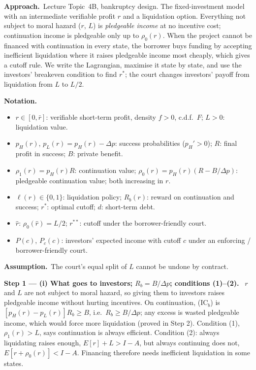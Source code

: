 \documentclass[11pt,a4paper]{article}
\newcommand{\notation}{\par\noindent\textbf{Notation.}}
\newcommand{\step}[2]{\par\medskip\noindent\textbf{Step #1 --- #2.}~}
\newcommand{\assume}{\par\smallskip\noindent\textbf{Assumption.}~}
\newcommand{\approach}{\par\smallskip\noindent\textbf{Approach.}~}
\begin{document}
\approach Lecture Topic~4B, bankruptcy design. The fixed-investment model with an intermediate
verifiable profit $r$ and a liquidation option. Everything not subject to moral hazard ($r$, $L$) is
\emph{pledgeable income} at no incentive cost; continuation income is pledgeable only up to
$\rho_0(r)$. When the project cannot be financed with continuation in every state, the borrower buys
funding by accepting inefficient liquidation where it raises pledgeable income most cheaply, which
gives a cutoff rule. We write the Lagrangian, maximise it state by state, and use the investors'
breakeven condition to find $r^*$; the court changes investors' payoff from liquidation from $L$ to
$L/2$.

\notation
\begin{itemize}
  \item $r\in[0,\bar r]$: verifiable short-term profit, density $f>0$, c.d.f.\ $F$; $L>0$: liquidation value.
  \item $p_H(r)$, $p_L(r)=p_H(r)-\Delta p$: success probabilities ($p_H'>0$); $R$: final profit in success;
        $B$: private benefit.
  \item $\rho_1(r)=p_H(r)R$: continuation value; $\rho_0(r)=p_H(r)(R-B/\Delta p)$: pledgeable
        continuation value; both increasing in $r$.
  \item $\ell(r)\in\{0,1\}$: liquidation policy; $R_b(r)$: reward on continuation and success;
        $r^*$: optimal cutoff; $d$: short-term debt.
  \item $\hat r$: $\rho_0(\hat r)=L/2$; $r^{**}$: cutoff under the borrower-friendly court.
  \item $P(c)$, $P_c(c)$: investors' expected income with cutoff $c$ under an enforcing / borrower-friendly court.
\end{itemize}
\assume The court's equal split of $L$ cannot be undone by contract.

\step{1}{(i) What goes to investors; $R_b=B/\Delta p$; conditions (1)--(2)} $r$ and $L$ are not subject to
moral hazard, so giving them to investors raises pledgeable income without hurting incentives. On
continuation, (IC$_b$) is $[p_H(r)-p_L(r)]R_b\ge B$, i.e.\ $R_b\ge B/\Delta p$; any excess is wasted
pledgeable income, which would force more liquidation (proved in Step 2). Condition (1), $\rho_1(r)>L$,
says continuation is always efficient. Condition (2): always liquidating raises enough,
$E[r]+L>I-A$, but always continuing does not, $E[r+\rho_0(r)]<I-A$. Financing therefore needs
inefficient liquidation in some states.
\end{document}
